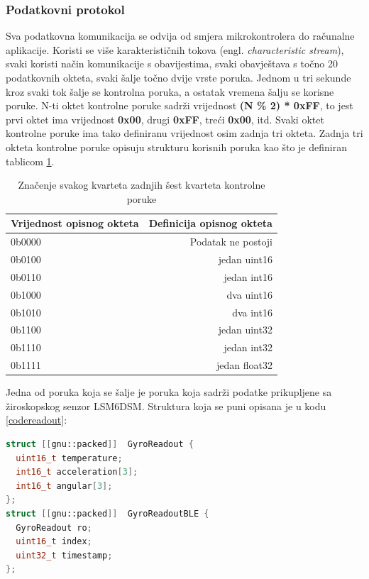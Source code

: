 \documentclass[times, utf8, diplomski]{diplomski}
\begin{document}
\subsubsection{Podatkovni protokol}
Sva podatkovna komunikacija se odvija od smjera mikrokontrolera do računalne aplikacije.
Koristi se više karakterističnih tokova (engl. \textit{characteristic stream}), svaki koristi način komunikacije s obavijestima, svaki obavještava s točno 20 podatkovnih okteta, svaki šalje točno dvije vrste poruka.
Jednom u tri sekunde kroz svaki tok šalje se kontrolna poruka, a ostatak vremena šalju se korisne poruke.
N-ti oktet kontrolne poruke sadrži vrijednost \textbf{(N \% 2) * 0xFF}, to jest prvi oktet ima vrijednost \textbf{0x00}, drugi \textbf{0xFF}, treći \textbf{0x00}, itd.
Svaki oktet kontrolne poruke ima tako definiranu vrijednost osim zadnja tri okteta.
Zadnja tri okteta kontrolne poruke opisuju strukturu korisnih poruka kao što je definiran tablicom \ref{datatable}.

\begin{table}[H]
  \begin{center}
    \begin{tabular}[c]{l|r}
      \multicolumn{1}{c|}{\textbf{Vrijednost opisnog okteta}} & 
      \multicolumn{1}{c}{\textbf{Definicija opisnog okteta}} \\
      \hline
      0b0000 & Podatak ne postoji \\
      0b0100 & jedan uint16 \\
      0b0110 & jedan int16 \\
      0b1000 & dva uint16 \\
      0b1010 & dva int16 \\
      0b1100 & jedan uint32 \\
      0b1110 & jedan int32 \\
      0b1111 & jedan float32 \\
      \hline
    \end{tabular}
  \caption{Značenje svakog kvarteta zadnjih šest kvarteta kontrolne poruke}
  \label{datatable}
  \end{center}
\end{table}

Jedna od poruka koja se šalje je poruka koja sadrži podatke prikupljene sa žiroskopskog senzor LSM6DSM. Struktura koja se puni opisana je u kodu \ref{codereadout}:

\begin{lstlisting}[language=c++, caption = {Definicija strukture koja se šalje Bluetoothom}, label={codereadout}]
 struct [[gnu::packed]]  GyroReadout {
  uint16_t temperature;
  int16_t acceleration[3];
  int16_t angular[3];
};
struct [[gnu::packed]]  GyroReadoutBLE {
  GyroReadout ro;
  uint16_t index;
  uint32_t timestamp;
};
\end{lstlisting}
\end{document}
